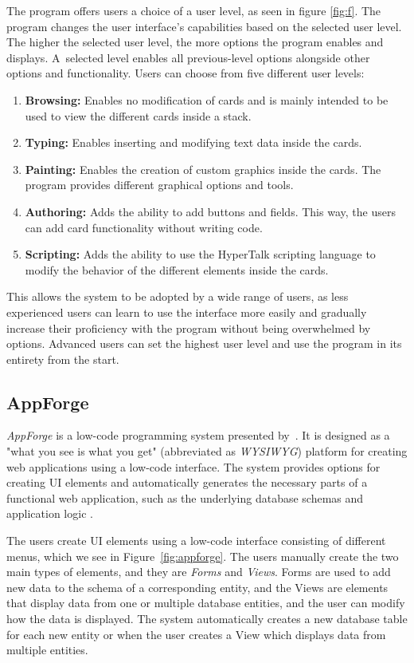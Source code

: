 The program offers users a choice of a user level, as seen in figure \ref{fig:f}. The program changes the user interface's capabilities based on the selected user level.
The higher the selected user level, the more options the program enables and displays. A~selected level enables all previous-level options alongside other options and functionality.
Users can choose from five different user levels:
\begin{enumerate}
	\item \textbf{Browsing:} Enables no modification of cards and is mainly intended to be used to view the different cards inside a stack.
	\item \textbf{Typing:} Enables inserting and modifying text data inside the cards.
	\item \textbf{Painting:} Enables the creation of custom graphics inside the cards. The program provides different graphical options and tools.
	\item \textbf{Authoring:} Adds the ability to add buttons and fields. This way, the users can add card functionality without writing code.
	\item \textbf{Scripting:} Adds the ability to use the HyperTalk scripting language to modify the behavior of the different elements inside the cards.
\end{enumerate}
This allows the system to be adopted by a wide range of users, as less experienced users can learn to use the interface more easily and gradually increase their proficiency with the program without being overwhelmed by options.
Advanced users can set the highest user level and use the program in its entirety from the start.

\subsection{AppForge}
\emph{AppForge} is a low-code programming system presented by~\citet{Yang_Gupta_Botev_Churchill_Levchenko_Shanmugasundaram_2008}.
It is designed as a "what you see is what you get" (abbreviated as \emph{WYSIWYG}) platform for creating web applications using a low-code interface.
The system provides options for creating UI elements and automatically generates the necessary parts of a functional web application, such as the underlying database schemas and application logic \cite{Yang_Gupta_Botev_Churchill_Levchenko_Shanmugasundaram_2008}.

The users create UI elements using a low-code interface consisting of different menus, which we see in Figure~\ref{fig:appforge}.
The users manually create the two main types of elements, and they are \emph{Forms} and \emph{Views}.
Forms are used to add new data to the schema of a corresponding entity, and the Views are elements that display data from one or multiple database entities, and the user can modify how the data is displayed.
The system automatically creates a new database table for each new entity or when the user creates a View which displays data from multiple entities.

